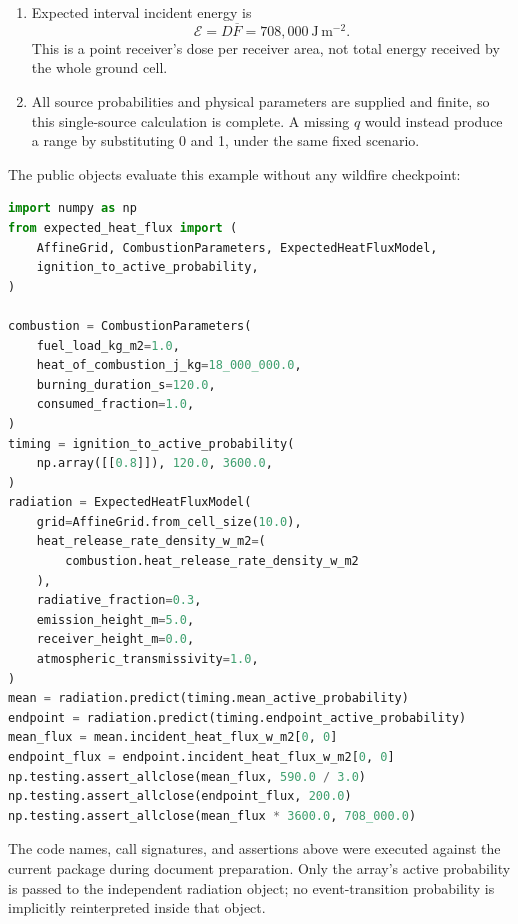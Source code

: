 \documentclass[11pt,a4paper]{article}
\begin{document}
\begin{enumerate}
Neither equals the next-hour transition probability multiplied directly by
the conditional active-cell flux.
\item Expected interval incident energy is
\begin{equation}
\mathcal E=D\overline F=708{,}000\ \mathrm{J\,m^{-2}}.
\end{equation}
This is a point receiver's dose per receiver area, not total energy received
by the whole ground cell.
\item All source probabilities and physical parameters are supplied and finite,
so this single-source calculation is complete. A missing $q$ would instead
produce a range by substituting 0 and 1, under the same fixed scenario.
\end{enumerate}

The public objects evaluate this example without any wildfire checkpoint:
\begin{lstlisting}[language=Python]
import numpy as np
from expected_heat_flux import (
    AffineGrid, CombustionParameters, ExpectedHeatFluxModel,
    ignition_to_active_probability,
)

combustion = CombustionParameters(
    fuel_load_kg_m2=1.0,
    heat_of_combustion_j_kg=18_000_000.0,
    burning_duration_s=120.0,
    consumed_fraction=1.0,
)
timing = ignition_to_active_probability(
    np.array([[0.8]]), 120.0, 3600.0,
)
radiation = ExpectedHeatFluxModel(
    grid=AffineGrid.from_cell_size(10.0),
    heat_release_rate_density_w_m2=(
        combustion.heat_release_rate_density_w_m2
    ),
    radiative_fraction=0.3,
    emission_height_m=5.0,
    receiver_height_m=0.0,
    atmospheric_transmissivity=1.0,
)
mean = radiation.predict(timing.mean_active_probability)
endpoint = radiation.predict(timing.endpoint_active_probability)
mean_flux = mean.incident_heat_flux_w_m2[0, 0]
endpoint_flux = endpoint.incident_heat_flux_w_m2[0, 0]
np.testing.assert_allclose(mean_flux, 590.0 / 3.0)
np.testing.assert_allclose(endpoint_flux, 200.0)
np.testing.assert_allclose(mean_flux * 3600.0, 708_000.0)
\end{lstlisting}
The code names, call signatures, and assertions above were executed against
the current package during document preparation. Only the array's active probability is
passed to the independent radiation object; no event-transition probability
is implicitly reinterpreted inside that object.
\end{document}
